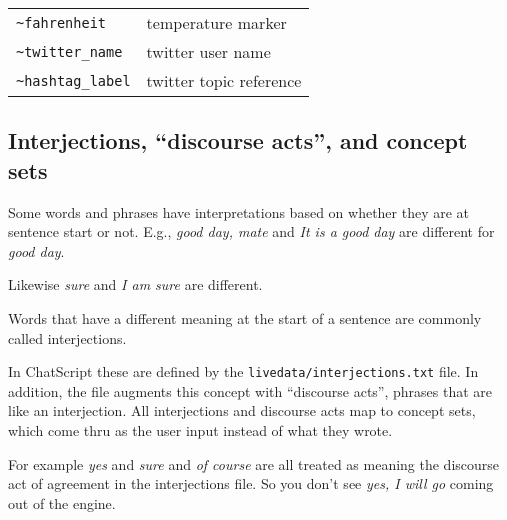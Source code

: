 \documentclass[]{article}
\begin{document}
\begin{longtable}[]{@{}ll@{}}
\begin{minipage}[t]{0.22\columnwidth}
\texttt{\textasciitilde{}fahrenheit}\strut
\end{minipage} & \begin{minipage}[t]{0.41\columnwidth}\raggedright\strut
temperature marker\strut
\end{minipage}\tabularnewline
\begin{minipage}[t]{0.22\columnwidth}\raggedright\strut
\texttt{\textasciitilde{}twitter\_name}\strut
\end{minipage} & \begin{minipage}[t]{0.41\columnwidth}\raggedright\strut
twitter user name\strut
\end{minipage}\tabularnewline
\begin{minipage}[t]{0.22\columnwidth}\raggedright\strut
\texttt{\textasciitilde{}hashtag\_label}\strut
\end{minipage} & \begin{minipage}[t]{0.41\columnwidth}\raggedright\strut
twitter topic reference\strut
\end{minipage}\tabularnewline
\bottomrule
\end{longtable}

\subsection{\texorpdfstring{Interjections, ``discourse acts'', and
concept
sets}{Interjections, discourse acts, and concept sets}}\label{interjections-discourse-acts-and-concept-sets}

Some words and phrases have interpretations based on whether they are at
sentence start or not. E.g., \emph{good day, mate} and \emph{It is a
good day} are different for \emph{good day}.

Likewise \emph{sure} and \emph{I am sure} are different.

Words that have a different meaning at the start of a sentence are
commonly called interjections.

In ChatScript these are defined by the
\texttt{livedata/interjections.txt} file. In addition, the file augments
this concept with ``discourse acts'', phrases that are like an
interjection. All interjections and discourse acts map to concept sets,
which come thru as the user input instead of what they wrote.

For example \emph{yes} and \emph{sure} and \emph{of course} are all
treated as meaning the discourse act of agreement in the interjections
file. So you don't see \emph{yes, I will go} coming out of the engine.
\end{document}
